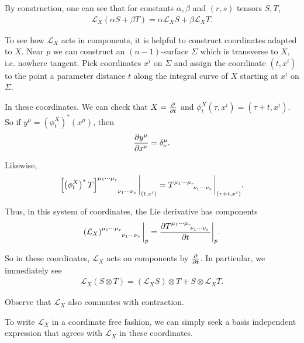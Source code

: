 By construction, one can see that for constants $\alpha, \beta$ and $\left( r,s \right) $ tensors $S,T$,
\begin{align}
    \mathcal{L}_X \left( \alpha S + \beta T \right) = \alpha \mathcal{L}_X S + \beta \mathcal{L}_X T
.\end{align}

To see how $\mathcal{L}_X$ acts in components, it is helpful to construct coordinates adapted to $X$. Near $p$ we can construct an $\left( n-1 \right) $-surface $\Sigma$ which is transverse to $X$, i.e. nowhere tangent. Pick coordinates $x^{i}$ on $\Sigma$ and assign the coordinate $\left( t,x^{i} \right) $ to the point a parameter distance $t$ along the integral curve of $X$ starting at $x^{i}$ on $\Sigma$.

In these coordinates. We can check that $X = \pdv{t}$ and $\phi_t^{X} \left( \tau, x^{i} \right) = \left( \tau + t, x^{i} \right)  $. So if $y^{\mu} = \left( \phi_t^{X} \right) ^{*}\left( x^{\mu} \right) $, then
\begin{align}
    \pdv{y^{\mu}}{x^{\nu}} = \delta^{\mu}_\nu
.\end{align}

Likewise,
\begin{align}
    \tensor{\left[ \left( \phi_t^{X} \right)^{*} T\right]}{^{\mu_1 \cdots \mu_r}_{\nu_1 \cdots \nu_s}}  \bigg|_{\left( t,x^{i} \right)} = \tensor{T}{^{\mu_1 \cdots \mu_r}_{\nu_1 \cdots \nu_s}} \bigg|_{\left( \tau + t, x^{i} \right) } 
.\end{align}

Thus, in this system of coordinates, the Lie derivative has components 
\begin{align}
    \tensor{\left( \mathcal{L}_X \right)}{^{\mu_1 \cdots \mu_r}_{\nu_1 \cdots \nu_s}} \bigg|_p = \pdv{\tensor{T}{^{\mu_1 \cdots \mu_r}_{\nu_1 \cdots \nu_s}}}{t} \bigg|_{p}
.\end{align}

So in these coordinates, $\mathcal{L}_X$ acts on components by $\pdv{t}$. In particular, we immediately see
\begin{align}
    \mathcal{L}_X \left( S \otimes T \right) = \left( \mathcal{L}_X S \right) \otimes T + S \otimes \mathcal{L}_X T
.\end{align}

Observe that $\mathcal{L}_X$ also commutes with contraction.

To write $\mathcal{L}_X$ in a coordinate free fashion, we can simply seek a basis independent expression that agrees with $\mathcal{L}_X$ in these coordinates.


